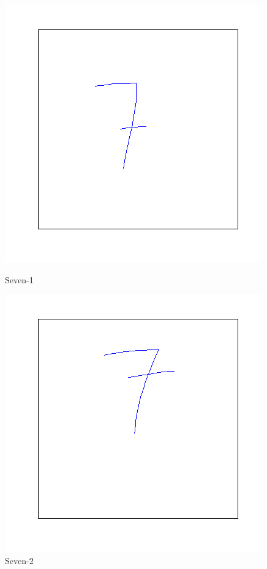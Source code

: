 \documentclass[a4paper, 10pt]{article}
\begin{document}
\begin{figure}[ht]
\begin{minipage}[b]{0.45\linewidth}
\centering
\includegraphics[width=\textwidth]{figs/7-1}
\caption{Seven-1}
\label{fig:figure1}
\end{minipage}
\hspace{0.5cm}
\begin{minipage}[b]{0.45\linewidth}
\centering
\includegraphics[width=\textwidth]{figs/7-2}
\caption{Seven-2}
\label{fig:figure2}
\end{minipage}
\end{figure}
\end{document}
